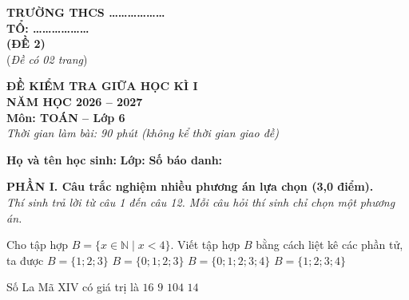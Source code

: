 
\noindent
\begin{minipage}[t]{6.5cm}
	\centering
	\textbf{TRƯỜNG THCS \dots\dots\dots\dots\dots\dots}\\[3pt]
	\textbf{TỔ: \dots\dots\dots\dots\dots\dots}\\[6pt]
	\textbf{(ĐỀ 2)}\\
	(\textit{Đề có 02 trang})
\end{minipage}%
\hfill
\begin{minipage}[t]{10.5cm}
	\centering
	\textbf{ĐỀ KIỂM TRA GIỮA HỌC KÌ I}\\[3pt]
	\textbf{NĂM HỌC 2026 -- 2027}\\[3pt]
	\textbf{Môn: TOÁN -- Lớp 6}\\[3pt]
	\textit{Thời gian làm bài: 90 phút (không kể thời gian giao đề)}
\end{minipage}

\vspace{10pt}

\noindent
\textbf{Họ và tên học sinh:} \dotfill{} \textbf{Lớp:} \makebox[2.5cm]{\dotfill} \textbf{Số báo danh:} \makebox[2.5cm]{\dotfill}

\vspace{10pt}

\noindent\textbf{PHẦN I. Câu trắc nghiệm nhiều phương án lựa chọn (3,0 điểm).}\\
\textit{Thí sinh trả lời từ câu 1 đến câu 12. Mỗi câu hỏi thí sinh chỉ chọn một phương án.}

\setcounter{ex}{0}

\begin{ex}%
	Cho tập hợp $B = \{x \in \mathbb{N} \mid x < 4\}$. Viết tập hợp $B$ bằng cách liệt kê các phần tử, ta được
	\choice
	{$B = \{1; 2; 3\}$}
	{\True $B = \{0; 1; 2; 3\}$}
	{$B = \{0; 1; 2; 3; 4\}$}
	{$B = \{1; 2; 3; 4\}$}
\end{ex}

\begin{ex}%
	Số La Mã $\mathrm{XIV}$ có giá trị là
	\choice
	{$16$}
	{$9$}
	{$104$}
	{\True $14$}
\end{ex}


